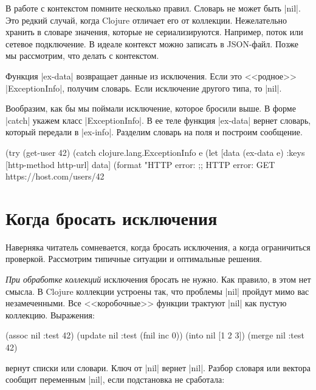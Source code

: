 В работе с контекстом помните несколько правил. Словарь не может быть
\spverb|nil|. Это редкий случай, когда Clojure отличает его от
коллекции. Нежелательно хранить в словаре значения, которые не
сериализируются. Например, поток или сетевое подключение. В идеале контекст
можно записать в JSON-файл. Позже мы рассмотрим, что делать с контекстом.

Функция \spverb|ex-data| возвращает данные из исключения. Если это <<родное>>
\spverb|ExceptionInfo|, получим словарь. Если исключение другого типа, то
\spverb|nil|.

Вообразим, как бы мы поймали исключение, которое бросили выше. В форме
\spverb|catch| укажем класс \spverb|ExceptionInfo|. В ее теле функция
\spverb|ex-data| вернет словарь, который передали в \spverb|ex-info|. Разделим
словарь на поля и построим сообщение.

\begin{english}
  \begin{clojure}
(try
  (get-user 42)
  (catch clojure.lang.ExceptionInfo e
    (let [data (ex-data e)
          {:keys [http-method http-url]} data]
      (format "HTTP error: %
;; HTTP error: GET https://host.com/users/42
  \end{clojure}
\end{english}

\section{Когда бросать исключения}

Наверняка читатель сомневается, когда бросать исключения, а когда ограничиться
проверкой. Рассмотрим типичные ситуации и оптимальные решения.

\emph{При обработке коллекций} исключения бросать не нужно. Как правило, в этом
нет смысла. В Clojure коллекции устроены так, что проблемы \spverb|nil| пройдут
мимо вас незамеченными. Все <<коробочные>> функции трактуют \spverb|nil| как
пустую коллекцию. Выражения:

\begin{english}
  \begin{clojure}
(assoc nil :test 42)
(update nil :test (fnil inc 0))
(into nil [1 2 3])
(merge nil {:test 42})
  \end{clojure}
\end{english}

\noindent
вернут списки или словари. Ключ от \spverb|nil| вернет \spverb|nil|. Разбор
словаря или вектора сообщит переменным \spverb|nil|, если подстановка не
сработала:

